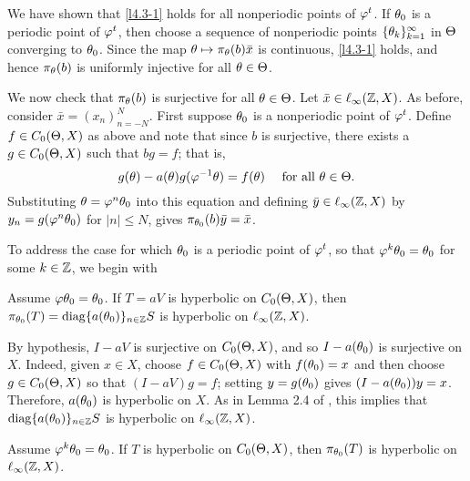 \begin{pf}
We have shown that \eqref{l4.3-1} holds for all nonperiodic points
of $\varphi^t$.  If $\theta_0$ is a periodic point of $\varphi^t$, then
choose a sequence of nonperiodic points $\{\theta_k\}_{k=1}^\infty$ in
$\Theta$ converging to $\theta_0$. Since the map
$\theta\mapsto \pi_\theta(b)\bar x$ is continuous, \eqref{l4.3-1} holds, and
hence $\pi_\theta(b)$ is uniformly injective for all $\theta\in \Theta$.


We now check that $\pi_\theta(b)$ is surjective for all $\theta\in \Theta$.
Let $\bar x\in\ell_\infty({\Bbb{Z}},X)$.  As before,
consider $\bar x=(x_n)_{n=-N}^N$.
First suppose $\theta_0$ is a nonperiodic point of $\varphi^t$.
Define $f\in C_0(\Theta,X)$ as above and note that since $b$ is surjective,
there exists a $g\in C_0(\Theta,X)$ such that $bg=f$; that is,
$$
g(\theta)-a(\theta)g(\varphi^{-1}\theta)=f(\theta)\quad\text{ for all }\theta\in \Theta.
$$
Substituting $\theta=\varphi^n\theta_0$ into this equation and
defining  $\bar y\in\ell_\infty({\Bbb{Z}},X)$ by $y_n=g(\varphi^n\theta_0)$  for $|n|\le N$,
gives $\pi_{\theta_0}(b)\bar y=\bar x$.

To address the case for which $\theta_0$ is a periodic point of
$\varphi^t$, so that $\varphi^k\theta_0=\theta_0$ for some $k\in{\Bbb{Z}}$, we begin
with

\begin{casekone} Assume $\varphi \theta_0=\theta_0$.  If $T=aV$ is hyperbolic
on $C_0(\Theta,X)$, then $\pi_{\theta_0}(T)=\operatorname{diag}\{a(\theta_0)\}_{n\in{\Bbb{Z}}}S$ is
hyperbolic on $\ell_\infty({\Bbb{Z}},X)$.
\end{casekone}

\begin{pf} By hypothesis, $I-aV$ is surjective on $C_0(\Theta,X)$,
and so $I-a(\theta_0)$ is surjective on $X$.  Indeed, given $x\in X$,
choose $f\in C_0(\Theta,X)$ with $f(\theta_0)=x$ and then choose $g\in C_0(\Theta,X)$ so that
$(I-aV)g=f$; setting $y=g(\theta_0)$ gives $(I-a(\theta_0))y=x$.   Therefore,
$a(\theta_0)$ is hyperbolic on $X$.  As in Lemma 2.4 of \cite{LMS1},
this implies that $\operatorname{diag}\{a(\theta_0)\}_{n\in{\Bbb{Z}}}S$ is hyperbolic on
$\ell_\infty({\Bbb{Z}},X)$.
\renewcommand{\qed}{}\end{pf}

\begin{casek} Assume $\varphi^k\theta_0=\theta_0$.  If $T$ is hyperbolic on
$C_0(\Theta,X)$, then $\pi_{\theta_0}(T)$ is hyperbolic on $\ell_\infty({\Bbb{Z}},X)$.
\end{casek}


\end{pf}
